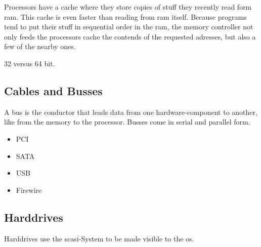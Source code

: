 Processors have a cache where they store copies of stuff they recently read form ram. This cache is even faster than reading from ram itself. Because programs tend to put their stuff in sequential order in the ram, the memory controller not only feeds the processors cache the contends of the requested adresses, but also a few of the nearby ones. 

32 versus 64 bit.


\subsection{Cables and Busses}

A bus is the conductor that leads data from one hardware-component to another, like from the memory to the processor. Busses come in serial and parallel form. 

\begin{itemize}
    \item PCI
    \item SATA
    \item USB
    \item Firewire
\end{itemize}



\subsection{Harddrives}
Harddrives use the scasi-System to be made visible to the os. 

